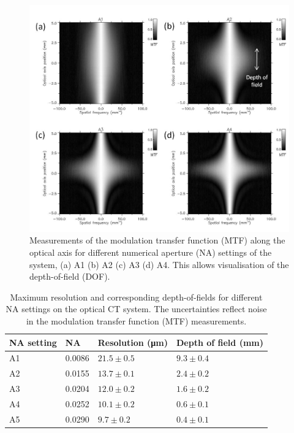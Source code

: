 	\begin{figure}[H]
		\centering
		\includegraphics[width=0.9\linewidth]{mrt_img/mrt_Fig6}
		\caption{Measurements of the modulation transfer function (MTF) along the optical axis for different numerical aperture (NA) settings of the system, (a) A1 (b) A2 (c) A3 (d) A4. This allows visualisation of the depth-of-field (DOF).}
		\label{fig:MTFDOF}
	\end{figure}
	
	\begin{table}[H]
		\centering
		\begin{tabular}{ p{2.5cm} p{1.8cm} p{3cm} p{3cm}  }
			\hline
			\textbf{NA setting} & \textbf{NA} & \textbf{Resolution (\si{\um})} &\textbf{Depth of field} (mm)  \\ \hline
			A1  & 0.0086 & $21.5 \pm 0.5$ & $9.3 \pm 0.4$ \\ %
			A2  & 0.0155 & $13.7 \pm 0.1$ & $2.4 \pm 0.2$ \\ %
			A3  & 0.0204 & $12.0 \pm 0.2$ & $1.6 \pm 0.2$ \\ %
			A4  & 0.0252 & $10.1 \pm 0.2$ & $0.6 \pm 0.1$ \\ %
			A5  & 0.0290 & $9.7  \pm 0.2$ & $0.4 \pm 0.1$ \\ \hline		
		\end{tabular}
		\caption{Maximum resolution and corresponding depth-of-fields for different NA settings on the optical CT system. The uncertainties reflect noise in the modulation transfer function (MTF)  measurements.}
		\label{table:DOFNA}
	\end{table}





